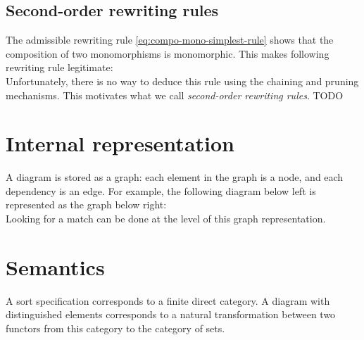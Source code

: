 \documentclass{article}
\begin{document}
\subsection{Second-order rewriting rules}
The admissible rewriting rule \eqref{eq:compo-mono-simplest-rule} shows that the composition of two monomorphisms is monomorphic.
This makes following rewriting rule legitimate:
\[

\]
Unfortunately, there is no way to deduce this rule using the chaining and pruning mechanisms.
This motivates what we call \emph{second-order rewriting rules}.
TODO
\section{Internal representation}
A diagram is stored as a graph: 
each element in the graph is a node, and each dependency is an edge.
For example, the following diagram below left is represented as the graph below right:
\[

\]
Looking for a match can be done at the level of this graph representation.
\section{Semantics}
A sort specification corresponds to a finite direct category. 
A diagram with distinguished elements corresponds to a 
natural transformation between two functors from this category to the category of sets.
\end{document}
